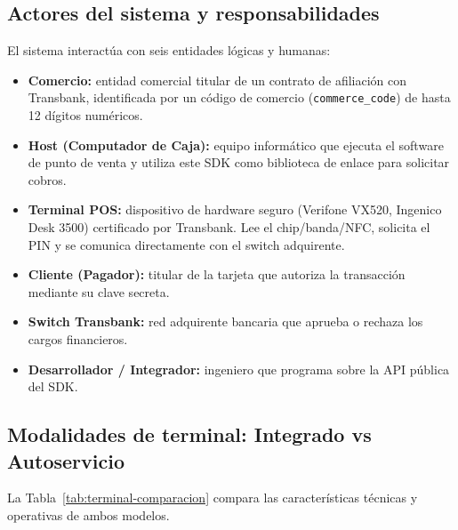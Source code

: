 \documentclass{../../plantilla/raysac-informe}
\begin{document}
\subsection{Actores del sistema y responsabilidades}
El sistema interactúa con seis entidades lógicas y humanas:
\begin{itemize}
  \item \textbf{Comercio:} entidad comercial titular de un contrato de afiliación con Transbank, identificada
    por un código de comercio (\texttt{commerce\_code}) de hasta 12 dígitos numéricos.
  \item \textbf{Host (Computador de Caja):} equipo informático que ejecuta el software de punto de venta y
    utiliza este SDK como biblioteca de enlace para solicitar cobros.
  \item \textbf{Terminal POS:} dispositivo de hardware seguro (Verifone VX520, Ingenico Desk 3500) certificado
    por Transbank. Lee el chip/banda/NFC, solicita el PIN y se comunica directamente con el switch adquirente.
  \item \textbf{Cliente (Pagador):} titular de la tarjeta que autoriza la transacción mediante su clave secreta.
  \item \textbf{Switch Transbank:} red adquirente bancaria que aprueba o rechaza los cargos financieros.
  \item \textbf{Desarrollador / Integrador:} ingeniero que programa sobre la API pública del SDK.
\end{itemize}

\subsection{Modalidades de terminal: Integrado vs Autoservicio}
La Tabla~\ref{tab:terminal-comparacion} compara las características técnicas y operativas de ambos modelos.
\end{document}
